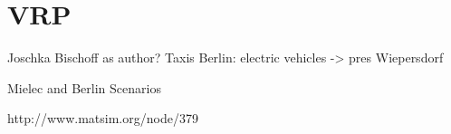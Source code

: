 \section{VRP}










Joschka Bischoff as author?
Taxis Berlin: electric vehicles -> pres Wiepersdorf

Mielec and Berlin Scenarios

http://www.matsim.org/node/379


